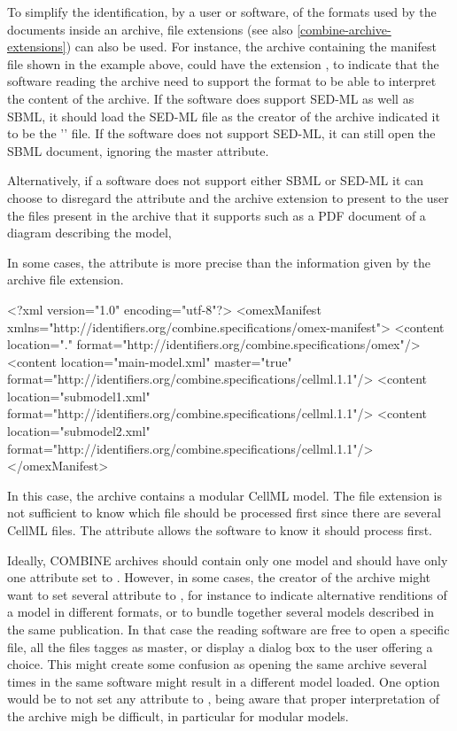 To simplify the identification, by a user or software, of the formats used by the documents inside an archive, file extensions 
(see also \ref{combine-archive-extensions}) can also be used. For instance, the archive containing the manifest file shown in the example above, could have the extension , to indicate that the software reading the archive need
to support the  format to be able to interpret the content of the archive. If the software
does support SED-ML as well as SBML, it should load the SED-ML file as the creator of the archive indicated
it to be the '' file. If the software does not support SED-ML, it can still open the SBML document, ignoring
the master attribute.

Alternatively, if a software does not support either SBML or SED-ML it can choose to disregard the  attribute and the archive extension to present to the user the files present in the archive that it supports such as a PDF document of a  diagram describing the model, 

In some cases, the  attribute is more precise than the information given by the archive file
extension.


\begin{example}
<?xml version="1.0" encoding="utf-8"?>
<omexManifest xmlns="http://identifiers.org/combine.specifications/omex-manifest">
    <content location="." 
        format="http://identifiers.org/combine.specifications/omex"/>
    <content location="main-model.xml" master="true"
        format="http://identifiers.org/combine.specifications/cellml.1.1"/>
    <content location="submodel1.xml" 
        format="http://identifiers.org/combine.specifications/cellml.1.1"/>
    <content location="submodel2.xml" 
        format="http://identifiers.org/combine.specifications/cellml.1.1"/>
</omexManifest>
\end{example}

In this case, the archive contains a modular CellML model. The file extension  is not sufficient to know which file should be processed first since there are several CellML files. The  attribute allows the software
to know it should process  first.

Ideally, COMBINE archives should contain only one model and should have only one  attribute set to . However, in some cases, the creator of the archive might want to set several  attribute to , for instance to indicate alternative renditions of a model in different formats, or to bundle together several models described in the same publication. In that case the reading software are free to open a specific file, all the files tagges as master, or display a dialog box to the user offering a choice. This might create some confusion as opening the same archive several times in the same software might result in a different model loaded. One option would be to not set any  attribute to , being aware that proper interpretation of the archive migh be difficult, in particular for modular models.  



